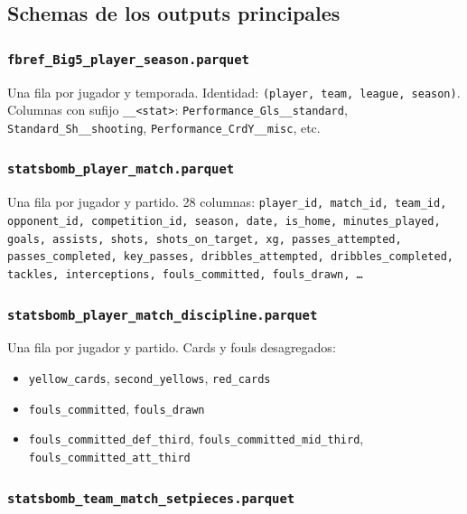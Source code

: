\subsection{Schemas de los outputs principales}

\subsubsection{\texttt{fbref\_Big5\_player\_season.parquet}}

Una fila por jugador y temporada. Identidad: \texttt{(player, team, league, season)}.\\
Columnas con sufijo \texttt{\_\_<stat>}: \texttt{Performance\_Gls\_\_standard}, \texttt{Standard\_Sh\_\_shooting}, \texttt{Performance\_CrdY\_\_misc}, etc.

\subsubsection{\texttt{statsbomb\_player\_match.parquet}}

Una fila por jugador y partido. 28 columnas: \texttt{player\_id, match\_id, team\_id, opponent\_id, competition\_id, season, date, is\_home, minutes\_played, goals, assists, shots, shots\_on\_target, xg, passes\_attempted, passes\_completed, key\_passes, dribbles\_attempted, dribbles\_completed, tackles, interceptions, fouls\_committed, fouls\_drawn, \ldots}

\subsubsection{\texttt{statsbomb\_player\_match\_discipline.parquet}}

Una fila por jugador y partido. Cards y fouls desagregados:
\begin{itemize}[noitemsep]
  \item \texttt{yellow\_cards}, \texttt{second\_yellows}, \texttt{red\_cards}
  \item \texttt{fouls\_committed}, \texttt{fouls\_drawn}
  \item \texttt{fouls\_committed\_def\_third}, \texttt{fouls\_committed\_mid\_third}, \texttt{fouls\_committed\_att\_third}
\end{itemize}

\subsubsection{\texttt{statsbomb\_team\_match\_setpieces.parquet}}

